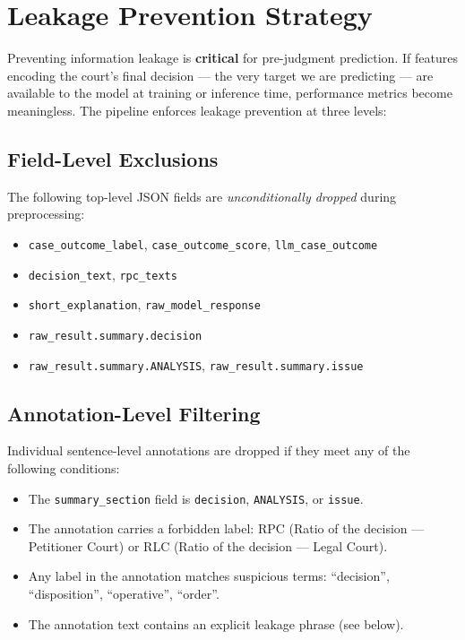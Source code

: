 \section{Leakage Prevention Strategy}
\label{sec:leakage}

Preventing information leakage is \textbf{critical} for pre-judgment prediction. If features encoding the court's final decision — the very target we are predicting — are available to the model at training or inference time, performance metrics become meaningless. The pipeline enforces leakage prevention at three levels:

\subsection{Field-Level Exclusions}

The following top-level JSON fields are \emph{unconditionally dropped} during preprocessing:

\begin{itemize}
    \item \texttt{case\_outcome\_label}, \texttt{case\_outcome\_score}, \texttt{llm\_case\_outcome}
    \item \texttt{decision\_text}, \texttt{rpc\_texts}
    \item \texttt{short\_explanation}, \texttt{raw\_model\_response}
    \item \texttt{raw\_result.summary.decision}
    \item \texttt{raw\_result.summary.ANALYSIS}, \texttt{raw\_result.summary.issue}
\end{itemize}

\subsection{Annotation-Level Filtering}

Individual sentence-level annotations are dropped if they meet any of the following conditions:

\begin{itemize}
    \item The \texttt{summary\_section} field is \texttt{decision}, \texttt{ANALYSIS}, or \texttt{issue}.
    \item The annotation carries a forbidden label: \textsc{RPC} (Ratio of the decision — Petitioner Court) or \textsc{RLC} (Ratio of the decision — Legal Court).
    \item Any label in the annotation matches suspicious terms: ``decision'', ``disposition'', ``operative'', ``order''.
    \item The annotation text contains an explicit leakage phrase (see below).
\end{itemize}

